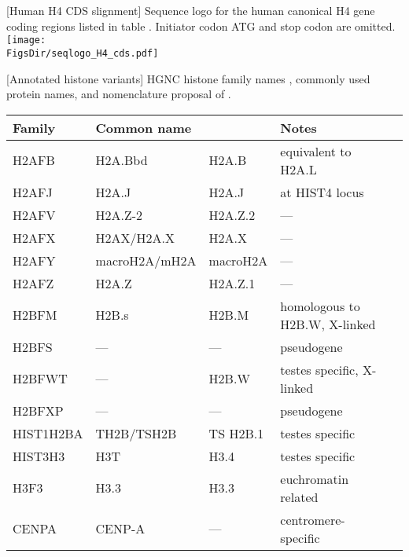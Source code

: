   \newpage
  \begin{minipage}{\textwidth}
  \begin{center}
    [Human H4 CDS slignment]{
        Sequence logo for the human canonical H4 gene coding regions
        listed in table .
        Initiator codon ATG and stop codon are omitted.
    }
    \label{fig:h4-histone-gene-variation}
    \texttt{[image: \\FigsDir/seqlogo\_H4\_cds.pdf]}
  \end{center}
  \end{minipage}

  \newpage
  \begin{center}
    [Annotated histone variants]{
        HGNC histone family names \citep{HGNC2015}, commonly used protein names,
        and nomenclature proposal of \citet{Talbert2012}.
    }
    \begin{tabular}{l l b{2.5cm}l l}
      \toprule
      Family & Common name & \citet{Talbert2012} & Notes \\
      \midrule
      H2AFB & H2A.Bbd & H2A.B & equivalent to H2A.L \\
      H2AFJ & H2A.J & H2A.J & at HIST4 locus \\
      H2AFV & H2A.Z-2 & H2A.Z.2 & --- \\
      H2AFX & H2AX/H2A.X & H2A.X & --- \\
      H2AFY & macroH2A/mH2A & macroH2A & --- \\
      H2AFZ & H2A.Z & H2A.Z.1 & --- \\
      H2BFM & H2B.s & H2B.M & homologous to H2B.W, X-linked\\
      H2BFS & --- & --- & pseudogene \\
      H2BFWT & --- & H2B.W & testes specific, X-linked \\
      H2BFXP & --- & --- & pseudogene \\
      HIST1H2BA & TH2B/TSH2B & TS H2B.1 & testes specific \\
      HIST3H3 & H3T & H3.4 & testes specific \\
      H3F3 & H3.3 & H3.3 & euchromatin related \\
      CENPA & CENP-A & --- & centromere-specific \\
      \bottomrule
    \end{tabular}
  \end{center}

